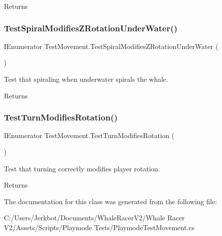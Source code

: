 \begin{DoxyReturn}{Returns}

\end{DoxyReturn}
\mbox{\label{class_test_movement_ad0a89a32757696be0407fe3fe128fbf6}} 
\subsubsection{\texorpdfstring{Test\+Spiral\+Modifies\+Z\+Rotation\+Under\+Water()}{TestSpiralModifiesZRotationUnderWater()}}
{\footnotesize\ttfamily I\+Enumerator Test\+Movement.\+Test\+Spiral\+Modifies\+Z\+Rotation\+Under\+Water (\begin{DoxyParamCaption}{ }\end{DoxyParamCaption})}



Test that spiraling when underwater spirals the whale. 

\begin{DoxyReturn}{Returns}

\end{DoxyReturn}
\mbox{\label{class_test_movement_a9eb3b16a356adc915132870fbbddde54}} 
\subsubsection{\texorpdfstring{Test\+Turn\+Modifies\+Rotation()}{TestTurnModifiesRotation()}}
{\footnotesize\ttfamily I\+Enumerator Test\+Movement.\+Test\+Turn\+Modifies\+Rotation (\begin{DoxyParamCaption}{ }\end{DoxyParamCaption})}



Test that turning correctly modifies player rotation. 

\begin{DoxyReturn}{Returns}

\end{DoxyReturn}


The documentation for this class was generated from the following file\+:\begin{DoxyCompactItemize}
\item 
C\+:/\+Users/\+Jerkbot/\+Documents/\+Whale\+Racer\+V2/\+Whale Racer V2/\+Assets/\+Scripts/\+Playmode Tests/Playmode\+Test\+Movement.\+cs\end{DoxyCompactItemize}
